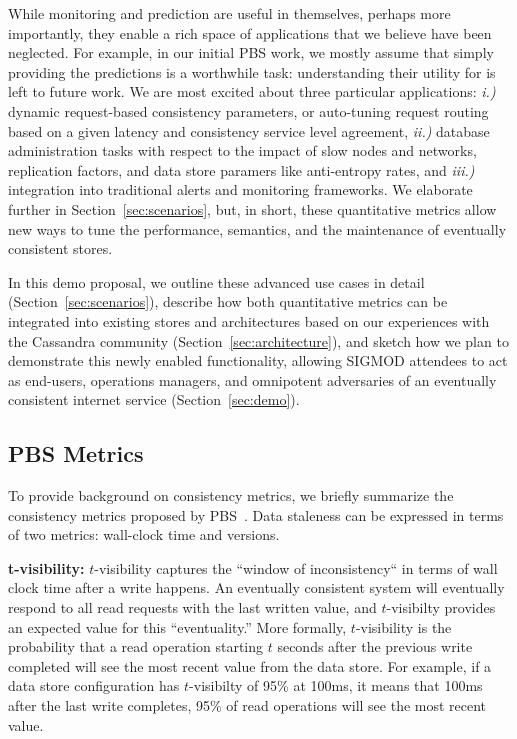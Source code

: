 While monitoring and prediction are useful in themselves, perhaps more
importantly, they enable a rich space of applications that we believe
have been neglected. For example, in our initial PBS work, we mostly
assume that simply providing the predictions is a worthwhile task:
understanding their utility for is left to future work. We are most
excited about three particular applications: \textit{i.)} dynamic
request-based consistency parameters, or auto-tuning request routing
based on a given latency and consistency service level agreement,
\textit{ii.)} database administration tasks with respect to the impact
of slow nodes and networks, replication factors, and data store
paramers like anti-entropy rates, and \textit{iii.)} integration into
traditional alerts and monitoring frameworks. We elaborate further in
Section~\ref{sec:scenarios}, but, in short, these quantitative metrics
allow new ways to tune the performance, semantics, and the maintenance
of eventually consistent stores.

In this demo proposal, we outline these advanced use cases in detail
(Section~\ref{sec:scenarios}), describe how both quantitative metrics
can be integrated into existing stores and architectures based on our
experiences with the Cassandra community
(Section~\ref{sec:architecture}), and sketch how we plan to
demonstrate this newly enabled functionality, allowing SIGMOD
attendees to act as end-users, operations managers, and omnipotent
adversaries of an eventually consistent internet service
(Section~\ref{sec:demo}).

\subsection{PBS Metrics}
To provide background on consistency metrics, we briefly summarize the
consistency metrics proposed by PBS~\cite{pbs-vldb2012}. Data
staleness can be expressed in terms of two metrics: wall-clock time
and versions.

\textbf{t-visibility:} $t$-visibility captures the ``window of
inconsistency`` in terms of wall clock time after a write happens. An
eventually consistent system will eventually respond to all read
requests with the last written value, and $t$-visibilty provides an expected
value for this ``eventuality.''  More formally, $t$-visibility is the
probability that a read operation starting $t$ seconds after the
previous write completed will see the most recent value from the data
store. For example, if a data store configuration has $t$-visibilty of
95\% at 100ms, it means that 100ms after the last write completes,
95\% of read operations will see the most recent value.

